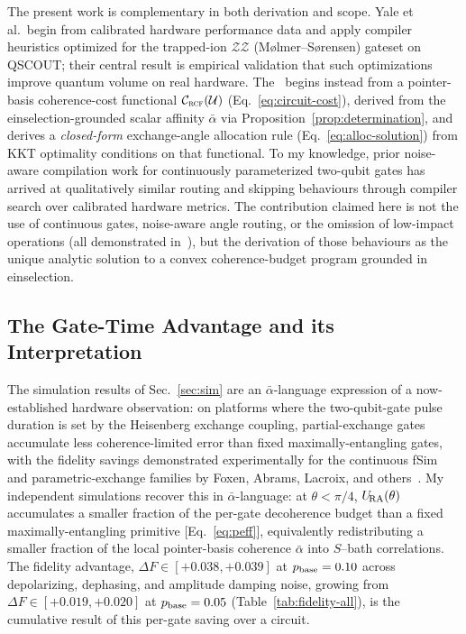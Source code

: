 The present work is complementary in both derivation and scope.
Yale et al.\ begin from calibrated hardware performance data and apply
compiler heuristics optimized for the trapped-ion $\mathcal{ZZ}$ (Mølmer--Sørensen)
gateset on QSCOUT; their central result is empirical validation that such
optimizations improve quantum volume on real hardware.
The \RCF~begins instead from a pointer-basis coherence-cost functional
$\mathcal{C}_{\textsc{rcf}}(\mathcal{U})$ (Eq.~\eqref{eq:circuit-cost}), derived from
the einselection-grounded scalar affinity $\bar\alpha$ via
Proposition~\ref{prop:determination}, and derives a \emph{closed-form}
exchange-angle allocation rule (Eq.~\eqref{eq:alloc-solution}) from
KKT optimality conditions on that functional.
To my knowledge, prior noise-aware compilation work for continuously
parameterized two-qubit gates has arrived at qualitatively similar routing
and skipping behaviours through compiler search over calibrated hardware metrics.
The contribution claimed here is not the use of continuous gates, noise-aware
angle routing, or the omission of low-impact operations (all demonstrated in~\cite{Yale2025NoiseAware}), but the derivation of those behaviours as the
unique analytic solution to a convex coherence-budget program grounded in
einselection.

\subsection{The Gate-Time Advantage and its Interpretation}

The simulation results of Sec.~\ref{sec:sim} are an
$\bar\alpha$-language expression of a now-established hardware
observation: on platforms where the two-qubit-gate pulse duration is
set by the Heisenberg exchange coupling, partial-exchange gates
accumulate less coherence-limited error than fixed maximally-entangling
gates, with the fidelity savings demonstrated experimentally for the
continuous fSim and parametric-exchange families by Foxen,
Abrams, Lacroix, and others~\cite{Foxen2020,Abrams2020,Lacroix2020,Caldwell2018}.
My independent simulations recover this in
$\bar\alpha$-language: at $\theta < \pi/4$, $U_{\!\mathrm{RA}}(\theta)$ accumulates
a smaller fraction of the per-gate decoherence budget than a fixed
maximally-entangling primitive [Eq.~\eqref{eq:peff}], equivalently
redistributing a smaller fraction of the local pointer-basis coherence
$\bar\alpha$ into $S$--bath correlations.
The fidelity advantage, $\Delta F \in [+0.038,+0.039]$ at
$p_{\rm base} = 0.10$ across depolarizing, dephasing, and amplitude
damping noise, growing from $\Delta F \in [+0.019,+0.020]$ at
$p_{\rm base} = 0.05$ (Table~\ref{tab:fidelity-all}), is the cumulative result of this per-gate saving over a circuit.

